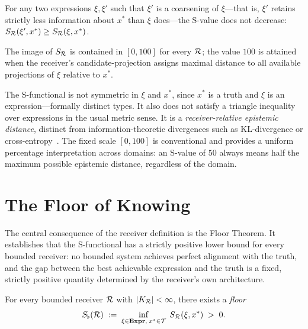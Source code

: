 \begin{axiom}\label{ax:S3}
For any two expressions $\xi, \xi'$ such that $\xi'$ is a coarsening of $\xi$---that is, $\xi'$ retains strictly less information about $x^*$ than $\xi$ does---the S-value does not decrease: $S_{\mathcal{R}}(\xi', x^*) \geq S_{\mathcal{R}}(\xi, x^*)$.
\end{axiom}

\begin{axiom}\label{ax:S4}
The image of $S_{\mathcal{R}}$ is contained in $[0, 100]$ for every $\mathcal{R}$; the value $100$ is attained when the receiver's candidate-projection assigns maximal distance to all available projections of $\xi$ relative to $x^*$.
\end{axiom}

\begin{remark}\label{rem:not-metric}
The S-functional is not symmetric in $\xi$ and $x^*$, since $x^*$ is a truth and $\xi$ is an expression---formally distinct types. It also does not satisfy a triangle inequality over expressions in the usual metric sense. It is a \emph{receiver-relative epistemic distance}, distinct from information-theoretic divergences such as KL-divergence or cross-entropy~\citep{shannon1949}. The fixed scale $[0,100]$ is conventional and provides a uniform percentage interpretation across domains: an S-value of $50$ always means half the maximum possible epistemic distance, regardless of the domain.
\end{remark}


\section{The Floor of Knowing}
\label{sec:floor-theorem}

The central consequence of the receiver definition is the Floor Theorem. It establishes that the S-functional has a strictly positive lower bound for every bounded receiver: no bounded system achieves perfect alignment with the truth, and the gap between the best achievable expression and the truth is a fixed, strictly positive quantity determined by the receiver's own architecture.

\begin{theorem}\label{thm:floor}
For every bounded receiver $\mathcal{R}$ with $|K_{\mathcal{R}}| < \infty$, there exists a \emph{floor}
\[
S_{\flat}(\mathcal{R}) \;:=\; \inf_{\xi \in \mathbf{Expr},\; x^* \in \mathcal{T}}\; S_{\mathcal{R}}(\xi, x^*) \;>\; 0.
\]
\end{theorem}

